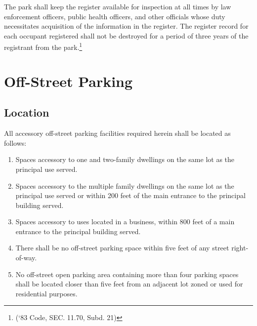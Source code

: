\subsubsection{}
The park shall keep the register available for inspection at all times by law enforcement officers, public health officers, and other officials whose duty necessitates acquisition of the information in the register. The register record for each occupant registered shall not be destroyed for a period of three years of the registrant from the park.\footnote{(‘83 Code, SEC. 11.70, Subd. 21)}

\section{Off-Street Parking}
\subsection{Location}
All accessory off-street parking facilities required herein shall be located as follows:
\begin{enumerate}[{\indent}1)]
    \item Spaces accessory to one and two-family dwellings on the same lot as the principal use served.
    \item Spaces accessory to the multiple family dwellings on the same lot as the principal use served or within 200 feet of the main entrance to the principal building served.
    \item Spaces accessory to uses located in a business, within 800 feet of a main entrance to the principal building served.
    \item There shall be no off-street parking space within five feet of any street right-of-way.
    \item No off-street open parking area containing more than four parking spaces shall be located closer than five feet from an adjacent lot zoned or used for residential purposes.
\end{enumerate}
